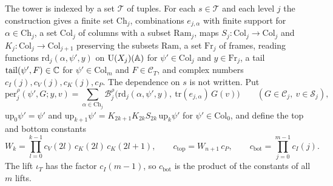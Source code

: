 The tower is indexed by a set $\mathcal T$ of tuples. For each $s\in\mathcal T$ and each level $j$ the construction gives a finite set $\mathrm{Ch}_j$, combinations $e_{j,\alpha}$ with finite support for $\alpha\in\mathrm{Ch}_j$, a set $\mathrm{Col}_j$ of columns with a subset $\mathrm{Ram}_j$, maps $S_j\colon\mathrm{Col}_j\to\mathrm{Col}_j$ and $K_j\colon\mathrm{Col}_j\to\mathrm{Col}_{j+1}$ preserving the subsets $\mathrm{Ram}$, a set $\mathrm{Fr}_j$ of frames, reading functions $\mathrm{rd}_j(\alpha,\psi',y)$ on $\mathrm U(X_j)(\mathbb A)$ for $\psi'\in\mathrm{Col}_j$ and $y\in\mathrm{Fr}_j$, a tail $\mathrm{tail}(\psi',F)\in\mathbb C$ for $\psi'\in\mathrm{Col}_m$ and $F\in\mathcal C_T$, and complex numbers $c_I(j),c_V(j),c_K(j),c_P$. The dependence on $s$ is not written. Put
\begin{equation}\label{w2:see:per}
\mathrm{per}^\rho_j(\psi',G;y,v)=\sum_{\alpha\in\mathrm{Ch}_j}\mathcal B^\rho_j\bigl(\mathrm{rd}_j(\alpha,\psi',y),\ \mathrm{tr}(e_{j,\alpha})\,G(v)\bigr)\qquad(G\in\mathcal C_j,\ v\in\mathcal S_j),
\end{equation}
$\mathrm{up}_0\psi'=\psi'$ and $\mathrm{up}_{k+1}\psi'=K_{2k+1}K_{2k}S_{2k}\,\mathrm{up}_k\psi'$ for $\psi'\in\mathrm{Col}_0$, and define the top and bottom constants
\begin{equation}\label{w2:see:const}
W_k=\prod_{l=0}^{k-1}c_V(2l)\,c_K(2l)\,c_K(2l+1),\qquad c_{\mathrm{top}}=W_{n+1}\,c_P,\qquad c_{\mathrm{bot}}=\prod_{j=0}^{m-1}c_I(j).
\end{equation}
The lift $\iota_T$ has the factor $c_I(m-1)$, so $c_{\mathrm{bot}}$ is the product of the constants of all $m$ lifts.

